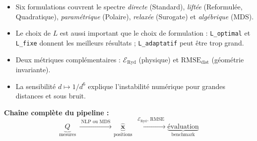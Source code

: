 \documentclass[12pt,a4paper]{article}
\begin{document}
\begin{tcolorbox}[colback=vert!5, colframe=vert!60!black,
                  title={\bfseries\color{white} Bilan}, arc=4pt]
\begin{itemize}[leftmargin=1.5em, itemsep=3pt]
  \item Six formulations couvrent le spectre
    \emph{directe} (Standard), \emph{liftée} (Reformulée, Quadratique),
    \emph{paramétrique} (Polaire), \emph{relaxée} (Surogate)
    et \emph{algébrique} (MDS).
  \item Le choix de $L$ est aussi important que le choix de formulation :
    \texttt{L\_optimal} et \texttt{L\_fixe} donnent les meilleurs résultats ;
    \texttt{L\_adaptatif} peut être trop grand.
  \item Deux métriques complémentaires : $\mathcal{E}_{\mathrm{Ryd}}$ (physique)
    et $\mathrm{RMSE}_{\mathrm{dist}}$ (géométrie invariante).
  \item La sensibilité $d\mapsto 1/d^6$ explique l'instabilité numérique
    pour grandes distances et sous bruit.
\end{itemize}
\end{tcolorbox}

\vspace{0.5cm}
\noindent
\textbf{Chaîne complète du pipeline :}
\[
  \underbrace{Q}_{\text{mesures}}
  \;\xrightarrow{\;\text{NLP ou MDS}\;}
  \underbrace{\hat{\mathbf{x}}}_{\text{positions}}
  \;\xrightarrow{\;\mathcal{E}_{\mathrm{Ryd}},\,\mathrm{RMSE}\;}
  \underbrace{\text{évaluation}}_{\text{benchmark}}
\]
\end{document}
